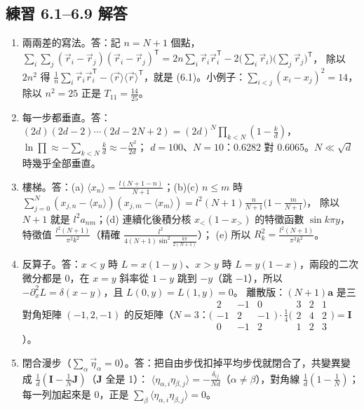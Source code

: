 \subsection{練習 6.1--6.9 解答}
{\small
\begin{enumerate}[label=\textbf{6.\arabic*},itemsep=0.05em]
\item 兩兩差的寫法。\quad 答：記 $n=N+1$ 個點，$\sum_i\sum_j(\vec r_i-\vec r_j)(\vec r_i-\vec r_j)^{\mathsf T}=2n\sum_i\vec r_i\vec r_i^{\mathsf T}-2\big(\sum_i\vec r_i\big)\big(\sum_j\vec r_j\big)^{\mathsf T}$，
除以 $2n^2$ 得 $\frac1n\sum_i\vec r_i\vec r_i^{\mathsf T}-\langle\vec r\rangle\langle\vec r\rangle^{\mathsf T}$，就是 (6.1)。小例子：$\sum_{i<j}(x_i-x_j)^2=14$，除以 $n^2=25$ 正是 $T_{11}=\frac{14}{25}$。
\item 每一步都垂直。\quad 答：$(2d)(2d-2)\cdots(2d-2N+2)=(2d)^N\prod_{k<N}(1-\frac kd)$，$\ln\prod\approx-\sum_{k<N}\frac kd\approx-\frac{N^2}{2d}$；
$d=100$、$N=10$：0.6282 對 0.6065。$N\ll\sqrt d$ 時幾乎全部垂直。
\item 樓梯。\quad 答：(a) $\langle x_n\rangle=\frac{l(N+1-n)}{N+1}$；(b)(c) $n\le m$ 時 $\sum_{j=0}^{N}(x_{j,n}-\langle x_n\rangle)(x_{j,m}-\langle x_m\rangle)=l^2(N+1)\frac{n}{N+1}\big(1-\frac{m}{N+1}\big)$，
除以 $N+1$ 就是 $l^2a_{nm}$；(d) 連續化後積分核 $x_<(1-x_>)$ 的特徵函數 $\sin k\pi y$，特徵值 $\frac{l^2(N+1)}{\pi^2k^2}$（精確 $\frac{l^2}{4(N+1)\sin^2\frac{k\pi}{2(N+1)}}$）；
(e) 所以 $R_k^2=\frac{l^2(N+1)}{\pi^2k^2}$。
\item 反算子。\quad 答：$x<y$ 時 $L=x(1-y)$、$x>y$ 時 $L=y(1-x)$，兩段的二次微分都是 0，在 $x=y$ 斜率從 $1-y$ 跳到 $-y$（跳 $-1$），所以 $-\partial_x^2L=\delta(x-y)$，且 $L(0,y)=L(1,y)=0$。
離散版：$(N+1)\mathbf a$ 是三對角矩陣 $(-1,2,-1)$ 的反矩陣（$N=3$：$\big(\begin{smallmatrix}2&-1&0\\-1&2&-1\\0&-1&2\end{smallmatrix}\big)\cdot\frac14\big(\begin{smallmatrix}3&2&1\\2&4&2\\1&2&3\end{smallmatrix}\big)=\mathbf I$）。
\item 閉合漫步（$\sum_\alpha\vec\eta_\alpha=0$）。\quad 答：把自由步伐扣掉平均步伐就閉合了，共變異變成 $\frac1d(\mathbf I-\frac1N\mathbf J)$（$\mathbf J$ 全是 1）：
$\langle\eta_{\alpha,i}\eta_{\beta,j}\rangle=-\frac{\delta_{ij}}{Nd}$（$\alpha\ne\beta$），對角線 $\frac1d(1-\frac1N)$；每一列加起來是 0，正是 $\sum_\beta\langle\eta_{\alpha,i}\eta_{\beta,j}\rangle=0$。

\end{enumerate}}
